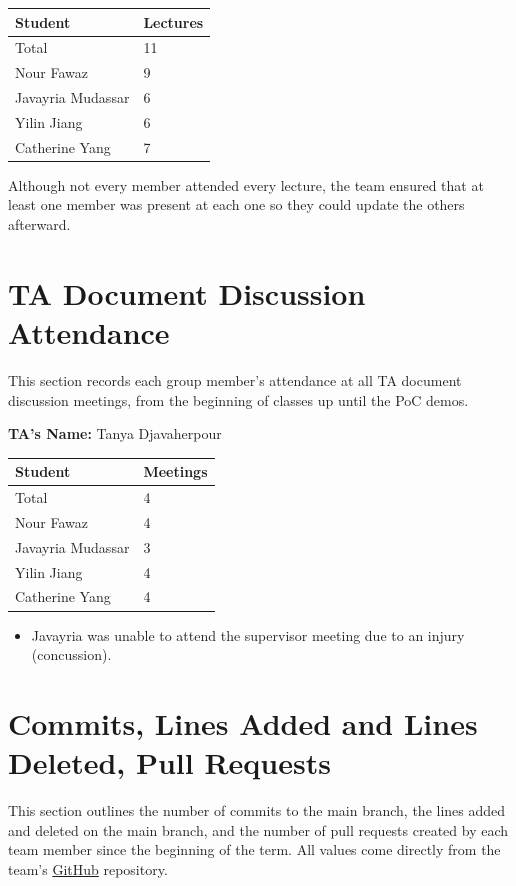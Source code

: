 \documentclass{article}
\newcommand{\repolink}[1]{\href{https://github.com/Nour-Fawaz/MacaBoca}{#1}}
\begin{document}
\begin{table}[H]
\centering
\begin{tabular}{ll}
\toprule
\textbf{Student} & \textbf{Lectures}\\
\midrule
Total & 11\\
Nour Fawaz & 9 \\
Javayria Mudassar & 6 \\
Yilin Jiang & 6 \\
Catherine Yang & 7 \\
\bottomrule
\end{tabular}
\end{table}
\noindent
Although not every member attended every lecture, the team ensured that at least one member was present at each one so they could update the others afterward.


\section{TA Document Discussion Attendance}
This section records each group member’s attendance at all TA document discussion meetings, from the beginning of classes up until the PoC demos.

\noindent \textbf{TA's Name: } Tanya Djavaherpour

\begin{table}[H]
\centering
\begin{tabular}{ll}
\toprule
\textbf{Student} & \textbf{Meetings}\\
\midrule
Total & 4\\
Nour Fawaz & 4 \\
Javayria Mudassar & 3 \\
Yilin Jiang & 4 \\
Catherine Yang & 4 \\
\bottomrule
\end{tabular}
\end{table}

\begin{itemize}
    \item Javayria was unable to attend the supervisor meeting due to an injury (concussion).
\end{itemize}

\section{Commits, Lines Added and Lines Deleted, Pull Requests}

This section outlines the number of commits to the main branch, the lines added
and deleted on the main branch, and the number of pull requests created by each
team member since the beginning of the term. All values
come directly from the team's \repolink{GitHub} repository.
\end{document}

